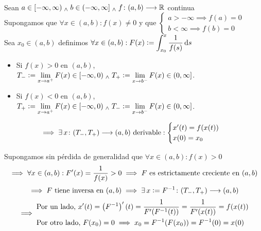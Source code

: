 \begin{teo} \mbox{} \\
	Sean $a\in [-\infty, \infty) \; _{\wedge} \; b\in (-\infty, \infty] \; _{\wedge} \; f \colon (a,b) \longrightarrow \mathbb{R}$ continua \\
	Supongamos que $\forall x \in (a,b) : f(x) \ne 0$ y que $\begin{cases}
			a>-\infty \implies f(a)=0 \\
			b<\infty \implies f(b)=0
		\end{cases}$ \\
	Sea $x_0 \in (a,b)$ definimos $\ds \forall x \in (a,b) : F(x)\defeq\int_{x_0}^{x} \frac{1}{f(s)} \odif{s}$ \\
	\begin{itemize}
		\item Si $f(x)>0$ en $(a,b)$, $\displaystyle T_-\vcentcolon= \lim_{x\to a^+}F(x)\in [-\infty, 0) \; _{\wedge} \; T_+\vcentcolon= \lim_{x\to b^-}F(x) \in (0, \infty]$.
		\item Si $f(x) < 0$ en $(a,b)$, $\displaystyle T_+\vcentcolon= \lim_{x\to a^+}F(x)\in [-\infty, 0) \; _{\wedge} \; T_-\vcentcolon= \lim_{x\to b^-}F(x) \in (0, \infty]$.
	\end{itemize}
	\[\implies \exists \, x \colon (T_-, T_+) \longrightarrow (a,b) \text{ derivable}: \begin{cases}
			x'(t)=f(x(t)) \\
			x(0)=x_0
		\end{cases}\]
	\begin{dem}
		Supongamos sin pérdida de generalidad que $\forall x \in (a,b) : f(x)>0$
		\[\implies \forall x \in (a,b) : F'(x)=\frac{1}{f(x)}>0 \implies F \text{ es estrictamente creciente en }(a,b)\]
		\[\implies F \text{ tiene inversa en } (a, b) \implies \exists\, x\vcentcolon= F^{-1} \colon (T_-,T_+) \longrightarrow (a,b)\]
		\[\implies \begin{aligned}         & \text{Por un lado, } x'(t) = \left(F^{-1}\right)'(t)=\frac{1}{F'(F^{-1}(t))}=\frac{1}{F'(x(t))} = f(x(t)) \\
                        & \text{Por otro lado, } F(x_0)=0 \implies x_0= F^{-1}(F(x_0))=F^{-1}(0)=x(0)\end{aligned}\]
	\end{dem}
\end{teo}

